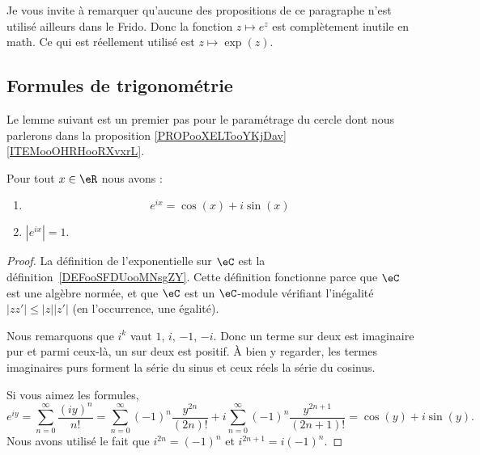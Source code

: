 Je vous invite à remarquer qu'aucune des propositions de ce paragraphe n'est utilisé ailleurs dans le Frido. Donc la fonction \( z\mapsto e^z\) est complètement inutile en math. Ce qui est réellement utilisé est \( z\mapsto\exp(z)\).

\subsection{Formules de trigonométrie}

Le lemme suivant est un premier pas pour le paramétrage du cercle dont nous parlerons dans la proposition \ref{PROPooXELTooYKjDav}\ref{ITEMooOHRHooRXvxrL}.
\begin{lemma}       \label{LEMooHOYZooKQTsXW}
	Pour tout \( x\in \eR\) nous avons :
	\begin{enumerate}
		\item
		      \begin{equation}        \label{EQooRVPJooTMwNTU}
			      e^{ix}=\cos(x)+i\sin(x)
		      \end{equation}
		\item
		      \( |  e^{ix} |=1\).
	\end{enumerate}
\end{lemma}

\begin{proof}
	La définition de l'exponentielle sur \( \eC\) est la définition~\ref{DEFooSFDUooMNsgZY}. Cette définition fonctionne parce que \( \eC\) est une algèbre normée, et que \( \eC\) est un \( \eC\)-module vérifiant l'inégalité \(  | zz' |\leq | z | |z' | \) (en l'occurrence, une égalité).

	Nous remarquons que \( i^k\) vaut \( 1\), \( i\), \( -1\), \( -i\). Donc un terme sur deux est imaginaire pur et parmi ceux-là, un sur deux est positif. À bien y regarder, les termes imaginaires purs forment la série du sinus et ceux réels la série du cosinus.

	Si vous aimez les formules,
	\begin{equation}
		e^{iy}=\sum_{n=0}^{\infty}\frac{ (iy)^n }{ n! }
		=\sum_{n=0}^{\infty}(-1)^n\frac{ y^{2n} }{ (2n)! }+i\sum_{n=0}^{\infty}(-1)^n\frac{ y^{2n+1} }{ (2n+1)! }
		=\cos(y)+i\sin(y).
	\end{equation}
	Nous avons utilisé le fait que \( i^{2n}=(-1)^n\) et \( i^{2n+1}=i(-1)^n\).
\end{proof}

